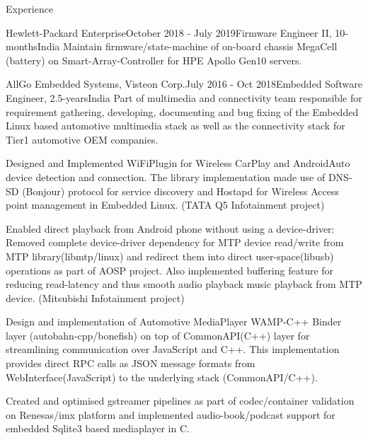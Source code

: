 \documentclass[
	a4paper, %
	11pt, %
]{resume} %
\begin{document}
\begin{rSection}{Experience}
\begin{rSubsection}{Hewlett-Packard Enterprise}{October 2018 - July 2019}{Firmware Engineer II, 10-months}{India}
            Maintain firmware/state-machine of on-board chassis MegaCell (battery) on Smart-Array-Controller for HPE
Apollo Gen10 servers.


	\end{rSubsection}

	\begin{rSubsection}{AllGo Embedded Systems, Visteon Corp.}{July 2016 - Oct 2018}{Embedded Software Engineer, 2.5-years}{India}
            Part of multimedia and connectivity team responsible for requirement gathering, developing, documenting and bug fixing of the Embedded Linux based automotive multimedia stack as well as the connectivity stack for Tier1 automotive OEM companies.

            Designed and Implemented WiFiPlugin for Wireless CarPlay and AndroidAuto device detection and connection. The library implementation made use of DNS-SD (Bonjour) protocol for service discovery and Hostapd for Wireless Access point management in Embedded Linux. (TATA Q5 Infotainment project) \hfill
            
            Enabled direct playback from Android phone without using a device-driver: Removed complete device-driver dependency for MTP device read/write from MTP library(libmtp/linux) and redirect them into direct user-space(libusb) operations as part of AOSP project. Also implemented buffering feature for reducing read-latency and thus smooth audio playback music playback from MTP device. (Mitsubishi Infotainment project) \hfill

            Design and implementation of Automotive MediaPlayer WAMP-C++ Binder layer (autobahn-cpp/bonefish) on top of CommonAPI(C++) layer for streamlining communication over JavaScript and C++. This implementation provides direct RPC calls as JSON message formats from WebInterface(JavaScript) to the underlying stack (CommonAPI/C++).

            Created and optimised gstreamer pipelines as part of codec/container validation on Renesas/imx platform and implemented audio-book/podcast support for embedded Sqlite3 based mediaplayer in C.


\end{rSubsection}
\end{rSection}
\end{document}
